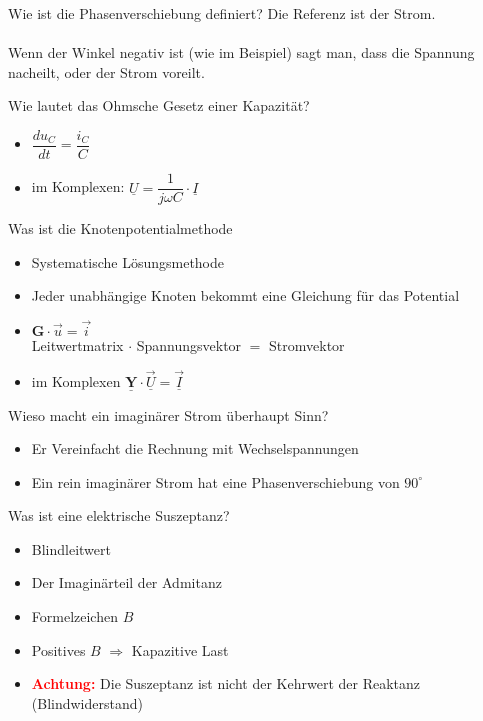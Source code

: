 \begin{karte}{Wie ist die Phasenverschiebung definiert?}
	Die Referenz ist der Strom.\\
	\\
	Wenn der Winkel negativ ist (wie im Beispiel) sagt man, dass die Spannung nacheilt, oder der Strom voreilt.
\end{karte}

\begin{karte}{Wie lautet das Ohmsche Gesetz einer Kapazität?}
	\begin{itemize}
		\item $\dfrac{du_{C}}{dt}=\dfrac{i_{C}}{C}$
		\item im Komplexen: $\underline{U} = \dfrac{1}{j \omega C} \cdot \underline{I}$
	\end{itemize}
\end{karte}

\begin{karte}{Was ist die Knotenpotentialmethode}
	\begin{itemize}
		\item Systematische Lösungsmethode
		\item Jeder unabhängige Knoten bekommt eine Gleichung für das Potential
		\item $\mathbf{G} \cdot \vec{u} = \vec{i}$\\
		Leitwertmatrix $\cdot$ Spannungsvektor $=$ Stromvektor
		\item im Komplexen 
		$\mathbf{\underline{Y}} \cdot \underline{\vec{U}} = \underline{\vec{I}}$
	\end{itemize}
\end{karte}

\begin{karte}{Wieso macht ein imaginärer Strom überhaupt Sinn?}
	\begin{itemize}
		\item Er Vereinfacht die Rechnung mit Wechselspannungen
		\item Ein rein imaginärer Strom hat eine Phasenverschiebung von $90^\circ$
	\end{itemize}
\end{karte}

\begin{karte}{Was ist eine elektrische Suszeptanz?}
	\begin{itemize}
		\item Blindleitwert
		\item Der Imaginärteil der Admitanz
		\item Formelzeichen $B$
		\item Positives $B$ $\Rightarrow$ Kapazitive Last
		\item \textcolor{red}{\textbf{Achtung:}} Die Suszeptanz ist nicht der Kehrwert der Reaktanz (Blindwiderstand)
	\end{itemize}
\end{karte}

